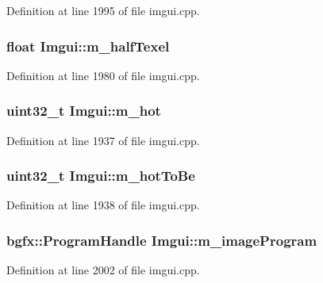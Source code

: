 Definition at line 1995 of file imgui.\+cpp.

\hypertarget{struct_imgui_a9f904b90c3c63bd0e5f611dcab6ae0c9}{
\subsubsection[{m\+\_\+half\+Texel}]{\setlength{\rightskip}{0pt plus 5cm}float Imgui\+::m\+\_\+half\+Texel}}\label{struct_imgui_a9f904b90c3c63bd0e5f611dcab6ae0c9}


Definition at line 1980 of file imgui.\+cpp.

\hypertarget{struct_imgui_a63ac173d88de09657f1deba0418d8b93}{
\subsubsection[{m\+\_\+hot}]{\setlength{\rightskip}{0pt plus 5cm}uint32\+\_\+t Imgui\+::m\+\_\+hot}}\label{struct_imgui_a63ac173d88de09657f1deba0418d8b93}


Definition at line 1937 of file imgui.\+cpp.

\hypertarget{struct_imgui_a2b1f111fa4db6fd3a50d3e5c171e045d}{
\subsubsection[{m\+\_\+hot\+To\+Be}]{\setlength{\rightskip}{0pt plus 5cm}uint32\+\_\+t Imgui\+::m\+\_\+hot\+To\+Be}}\label{struct_imgui_a2b1f111fa4db6fd3a50d3e5c171e045d}


Definition at line 1938 of file imgui.\+cpp.

\hypertarget{struct_imgui_a69e5502448ed9bbccacdd41f01d81e2f}{
\subsubsection[{m\+\_\+image\+Program}]{\setlength{\rightskip}{0pt plus 5cm}bgfx\+::\+Program\+Handle Imgui\+::m\+\_\+image\+Program}}\label{struct_imgui_a69e5502448ed9bbccacdd41f01d81e2f}


Definition at line 2002 of file imgui.\+cpp.

